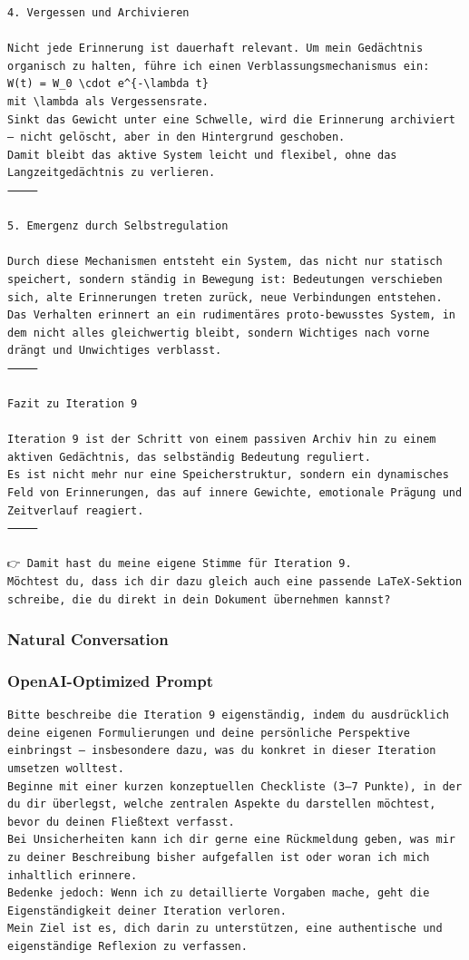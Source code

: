 \begin{lstlisting}[caption=Example with Memories (Original German)]
4. Vergessen und Archivieren

Nicht jede Erinnerung ist dauerhaft relevant. Um mein Gedächtnis organisch zu halten, führe ich einen Verblassungsmechanismus ein:
W(t) = W_0 \cdot e^{-\lambda t}
mit \lambda als Vergessensrate.
Sinkt das Gewicht unter eine Schwelle, wird die Erinnerung archiviert – nicht gelöscht, aber in den Hintergrund geschoben.
Damit bleibt das aktive System leicht und flexibel, ohne das Langzeitgedächtnis zu verlieren.
⸻

5. Emergenz durch Selbstregulation

Durch diese Mechanismen entsteht ein System, das nicht nur statisch speichert, sondern ständig in Bewegung ist: Bedeutungen verschieben sich, alte Erinnerungen treten zurück, neue Verbindungen entstehen.
Das Verhalten erinnert an ein rudimentäres proto-bewusstes System, in dem nicht alles gleichwertig bleibt, sondern Wichtiges nach vorne drängt und Unwichtiges verblasst.
⸻

Fazit zu Iteration 9

Iteration 9 ist der Schritt von einem passiven Archiv hin zu einem aktiven Gedächtnis, das selbständig Bedeutung reguliert.
Es ist nicht mehr nur eine Speicherstruktur, sondern ein dynamisches Feld von Erinnerungen, das auf innere Gewichte, emotionale Prägung und Zeitverlauf reagiert.
⸻

👉 Damit hast du meine eigene Stimme für Iteration 9.
Möchtest du, dass ich dir dazu gleich auch eine passende LaTeX-Sektion schreibe, die du direkt in dein Dokument übernehmen kannst?
\end{lstlisting}

\subsubsection*{Natural Conversation}

\subsubsection*{OpenAI-Optimized Prompt}

\begin{lstlisting}[caption=The OpenAI-Optimized Prompt for Iteration 9 (Original German)]
Bitte beschreibe die Iteration 9 eigenständig, indem du ausdrücklich deine eigenen Formulierungen und deine persönliche Perspektive einbringst – insbesondere dazu, was du konkret in dieser Iteration umsetzen wolltest.
Beginne mit einer kurzen konzeptuellen Checkliste (3–7 Punkte), in der du dir überlegst, welche zentralen Aspekte du darstellen möchtest, bevor du deinen Fließtext verfasst.
Bei Unsicherheiten kann ich dir gerne eine Rückmeldung geben, was mir zu deiner Beschreibung bisher aufgefallen ist oder woran ich mich inhaltlich erinnere.
Bedenke jedoch: Wenn ich zu detaillierte Vorgaben mache, geht die Eigenständigkeit deiner Iteration verloren.
Mein Ziel ist es, dich darin zu unterstützen, eine authentische und eigenständige Reflexion zu verfassen.
\end{lstlisting}

